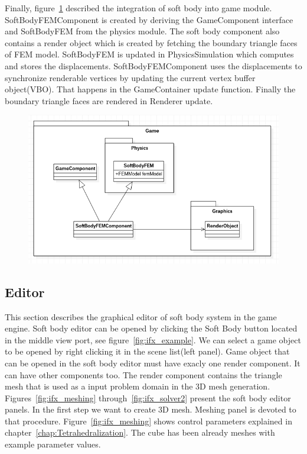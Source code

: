 \documentclass[en]{minipw} %
\begin{document}
Finally, figure~\ref{fig:ifx_game2} described the integration of soft body into game module. SoftBodyFEMComponent is created by deriving the GameComponent interface and SoftBodyFEM from the physics module. The soft body component also contains a render object which is created by fetching the boundary triangle faces of FEM model. SoftBodyFEM is updated in PhysicsSimulation which computes and stores the displacements. SoftBodyFEMComponent uses the displacements to synchronize renderable vertices by updating the current vertex buffer object(VBO). That happens in the GameContainer update function. Finally the boundary triangle faces are rendered in Renderer update.

\begin{figure}[h!]
\centering
\includegraphics[scale=0.5]{pictures/ifx_game2.png}
\caption[Logo MiNI]{}
\label{fig:ifx_game2}
\end{figure}


\subsection{Editor}
This section describes the graphical editor of soft body system in the game engine. Soft body editor can be opened by clicking the Soft Body button located in the middle view port, see figure~\ref{fig:ifx_example}. We can select a game object to be opened by right clicking it in the scene list(left panel). Game object that can be opened in the soft body editor must have exacly one render component. It can have other components too. The render component contains the triangle mesh that is used as a input problem domain in the 3D mesh generation. Figures~\ref{fig:ifx_meshing} through~\ref{fig:ifx_solver2} present the soft body editor panels. In the first step we want to create 3D mesh. Meshing panel is devoted to that procedure. Figure~\ref{fig:ifx_meshing} shows control parameters explained in chapter~\ref{chap:Tetrahedralization}. The cube has been already meshes with example parameter values.
\end{document}
